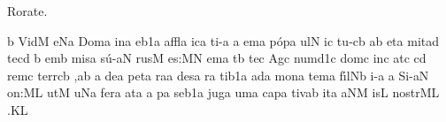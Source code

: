 \bigskip

Rorate.

\bigskip

\initiumgregorianum
\znotes\fissum{1pt}\bmolle b\en
%
\sgn V{i}{d}\punctum M\egn
\sgn {}e{}\pes Na\egn
\spatium
\begingroup
\bgenerale
\sgn Do{m}\punctum a\egn
\sgn {}i{n}\punctum a\egn
\sgn {}e{}\episem b1\punctum a\egn
\spatium
\sgn {}a{ffl}\punctum a\egn
\sgn {}ic\punctum a\egn
\sgn ti{-}\punctum a\egn
{}\punctum a\egn
\sgn {}em\punctum a\egn
\spatium
\sgn p{\'o}{p}\punctum a\egn
\sgn {}u{l}\punctum N\egn
\sgn {}i{}\punctum c\egn
\spatium
\sgn t{u}{-}\clivis cb\egn
{}\punctum a\augmentum b\egn
\spatium
\divisiominor
\spatium
\sgn {}et\punctum a\egn
\spatium
\sgn m{i}t\pes ad\egn
\sgn te{}\punctum c\augmentum d\egn
\spatium
\custos b
\lineaproxima
{}em\punctum b\egn
\spatium
\sgn mis\punctum a\egn
\sgn s{\'u}{-}\clivis aN\egn
\sgn rus\punctum M\egn
\spatium
\sgn {}e{s:}\punctum M\augmentum N\egn
\spatium
\divisiomaior
\spatium
\sgn {}e{m}\punctum a\egn
\sgn {}{\'\i}t\punctum b\egn
\sgn te{}\punctum c\egn
\spatium
\sgn {}Ag\punctum c\egn
\sgn num\episem d1\punctum c\egn
\spatium
\sgn dom\punctum c\egn
\sgn {}in\punctum c\egn
\sgn {}at\punctum c\egn
{}\pes cd\egn
\sgn rem\punctum c\egn
\spatium
\sgn t{e}{rr}\clivis cb\egn
\sgn {}{\ae},\punctum a\augmentum b\egn
\spatium
\divisiominor
\spatium
\custos a
\lineaproxima
\sgn de{}\punctum a\egn
\spatium
\sgn p{e}t\punctum a\egn
\sgn ra{}\punctum a\egn
\spatium
\sgn de{s}\punctum a\egn
{}r\punctum a\egn
\sgn ti{}\episem b1\punctum a\egn
\spatium
\sgn {}ad\punctum a\egn
\spatium
\sgn m{o}n\punctum a\egn
\sgn tem\punctum a\egn
\spatium
\sgn f{\'\i}{l}\pes Nb\egn
\sgn {}i{-}\punctum a\egn
\sgn {}{\ae}{}\punctum a\egn
\spatium
\sgn S{i}{-}\clivis aN\egn
\sgn {}o{n:}\punctum M\augmentum L\egn
\spatium
\divisiomaior
\spatium
\sgn {}ut\punctum M\egn
\spatium
{}u\pes Na\egn
\sgn fe{r}\punctum a\egn
\sgn {}at\punctum a\egn
\spatium
\custos a
\lineaproxima
{}p\punctum a\egn
\sgn se{}\episem b1\punctum a\egn
\spatium
\sgn j{u}{g}\punctum a\egn
\sgn {}um\punctum a\egn
\spatium
\sgn cap\punctum a\egn
\sgn ti{v}\pes ab\egn
\sgn {}i{t}\punctum a\egn
{}\climacus aNM\egn
{}is\punctum L\egn
\spatium
\sgn n{o}{str}\clivis ML\egn
\sgn {}{\ae}.\punctum K\augmentum L\egn
\endgroup
\Finisgregoriana

